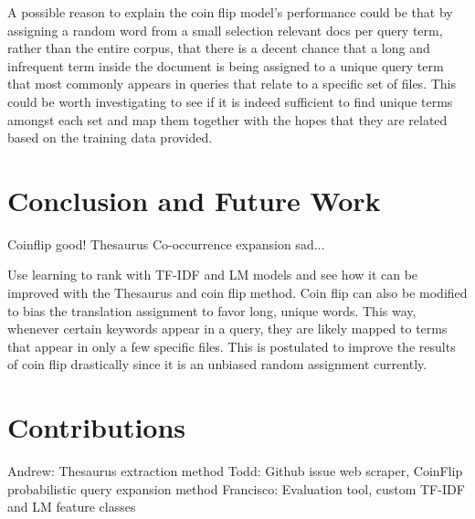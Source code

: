 \documentclass[10pt,a4paper]{article}
\begin{document}
A possible reason to explain the coin flip model’s performance could be that by assigning a random word from a small selection relevant docs per query term, rather than the entire corpus, that there is a decent chance that a long and infrequent term inside the document is being assigned to a unique query term that most commonly appears in queries that relate to a specific set of files. This could be worth investigating to see if it is indeed sufficient to find unique terms amongst each set and map them together with the hopes that they are related based on the training data provided.


\section{Conclusion and Future Work}

Coinflip good! Thesaurus Co-occurrence expansion sad...

Use learning to rank with TF-IDF and LM models and see how it can be improved with the Thesaurus and coin flip method. Coin flip can also be modified to bias the translation assignment to favor long, unique words. This way, whenever certain keywords appear in a query, they are likely mapped to terms that appear in only a few specific files. This is postulated to improve the results of coin flip drastically since it is an unbiased random assignment currently.

\section{Contributions}

Andrew: Thesaurus extraction method
Todd: Github issue web scraper, CoinFlip probabilistic query expansion method
Francisco: Evaluation tool, custom TF-IDF and LM feature classes
\end{document}
